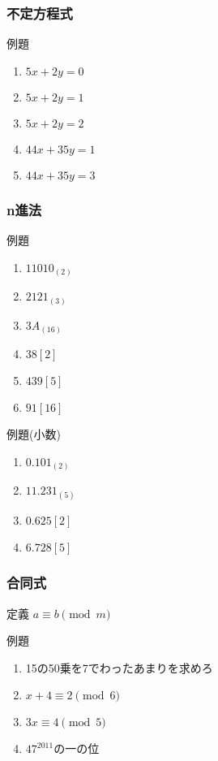 \documentclass[10pt,dvipdfmx]{jsarticle}
\begin{document}
\subsubsection*{不定方程式}
\begin{itembox}[l]{例題}
  \begin{large}
    \begin{enumerate}
      \item $5x+2y=0$
      \item $5x+2y=1$
      \item $5x+2y=2$
      \item $44x+35y=1$
      \item $44x+35y=3$
    \end{enumerate}
  \end{large}
\end{itembox}

\subsubsection*{n進法}
\begin{itembox}[l]{例題}
  \begin{multicols}{2}
    \begin{large}
      \begin{enumerate}
        \item $11010_{(2)}$
        \item $2121_{(3)}$
        \item $3A_{(16)}$
        \item $38 [2]$
        \item $439 [5]$
        \item $91 [16]$
      \end{enumerate}
    \end{large}
  \end{multicols}
\end{itembox}
\begin{itembox}[l]{例題(小数)}
  \begin{multicols}{2}
    \begin{large}
      \begin{enumerate}
        \item $0.101_{(2)}$
        \item $11.231_{(5)}$
        \item $0.625[2]$
        \item $6.728[5]$
      \end{enumerate}
    \end{large}
  \end{multicols}
\end{itembox}

\subsubsection*{合同式}
定義 $a\equiv b \pmod m$
\begin{itembox}[l]{例題}
  \begin{large}
    \begin{enumerate}
      \item 15の50乗を7でわったあまりを求めろ
      \item $x+4\equiv 2\pmod 6$
      \item $3x\equiv 4 \pmod 5$
      \item $47^2011$の一の位
    \end{enumerate}
  \end{large}
\end{itembox}
\end{document}
